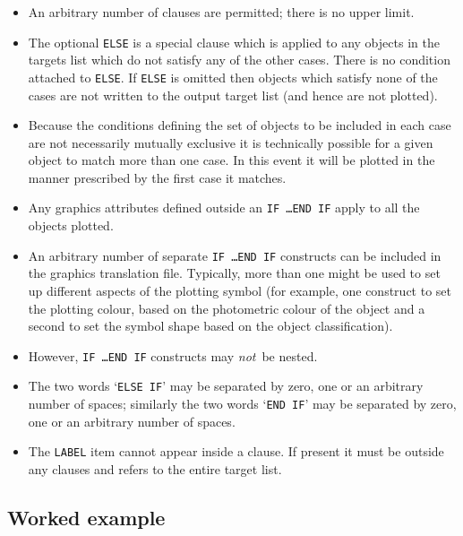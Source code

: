 \documentclass[twoside,11pt]{article}
\renewcommand{\_}{\texttt{\symbol{95}}}
\begin{document}
\begin{itemize}

  \item An arbitrary number of clauses are permitted; there is no upper
   limit.

  \item The optional {\tt ELSE} is a special clause which is applied
   to any objects in the targets list which do not satisfy any of the
   other cases.  There is no condition attached to {\tt ELSE}.  If
   {\tt ELSE} is omitted then objects which satisfy none of the cases
   are not written to the output target list (and hence are not
   plotted).

  \item Because the conditions defining the set of objects to be included
   in each case are not necessarily mutually exclusive it is technically
   possible for a given object to match more than one case.  In this event
   it will be plotted in the manner prescribed by the first case it
   matches.

  \item Any graphics attributes defined outside an {\tt IF \ldots END
   IF} apply to all the objects plotted.

  \item An arbitrary number of separate {\tt IF \ldots END IF} constructs
   can be included in the graphics translation file.  Typically, more than
   one might be used to set up different aspects of the plotting symbol
   (for example, one construct to set the plotting colour, based on the
   photometric colour of the object and a second to set the symbol shape
   based on the object classification).

  \item However, {\tt IF \ldots END IF} constructs may {\it not}\, be
   nested.

  \item The two words `{\tt ELSE IF}' may be separated by zero, one
   or an arbitrary number of spaces; similarly the two words `{\tt END IF}'
   may be separated by zero, one or an arbitrary number of spaces.

  \item The {\tt LABEL} item cannot appear inside a clause.  If present it
   must be outside any clauses and refers to the entire target list.

\end{itemize}

\subsection{\label{EXAMPLECHART}Worked example}
\end{document}
